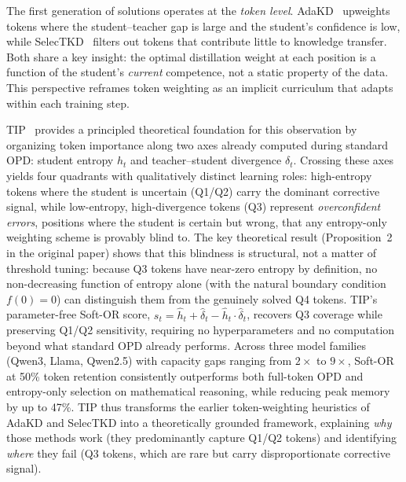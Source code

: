 \documentclass{article} %
\begin{document}
The first generation of solutions operates at the \emph{token level}. AdaKD~\citep{2510.11615} upweights tokens where the student--teacher gap is large and the student's confidence is low, while SelecTKD~\citep{2510.24021} filters out tokens that contribute little to knowledge transfer. Both share a key insight: the optimal distillation weight at each position is a function of the student's \emph{current} competence, not a static property of the data. This perspective reframes token weighting as an implicit curriculum that adapts within each training step.

TIP~\citep{xu2026tip} provides a principled theoretical foundation for this observation by organizing token importance along two axes already computed during standard OPD: student entropy $h_t$ and teacher--student divergence $\delta_t$. Crossing these axes yields four quadrants with qualitatively distinct learning roles: high-entropy tokens where the student is uncertain (Q1/Q2) carry the dominant corrective signal, while low-entropy, high-divergence tokens (Q3) represent \emph{overconfident errors}, positions where the student is certain but wrong, that any entropy-only weighting scheme is provably blind to. The key theoretical result (Proposition~2 in the original paper) shows that this blindness is structural, not a matter of threshold tuning: because Q3 tokens have near-zero entropy by definition, no non-decreasing function of entropy alone (with the natural boundary condition $f(0)=0$) can distinguish them from the genuinely solved Q4 tokens. TIP's parameter-free Soft-OR score, $s_t = \hat{h}_t + \hat{\delta}_t - \hat{h}_t \cdot \hat{\delta}_t$, recovers Q3 coverage while preserving Q1/Q2 sensitivity, requiring no hyperparameters and no computation beyond what standard OPD already performs. Across three model families (Qwen3, Llama, Qwen2.5) with capacity gaps ranging from $2\times$ to $9\times$, Soft-OR at 50\% token retention consistently outperforms both full-token OPD and entropy-only selection on mathematical reasoning, while reducing peak memory by up to 47\%. TIP thus transforms the earlier token-weighting heuristics of AdaKD and SelecTKD into a theoretically grounded framework, explaining \emph{why} those methods work (they predominantly capture Q1/Q2 tokens) and identifying \emph{where} they fail (Q3 tokens, which are rare but carry disproportionate corrective signal).
\end{document}
